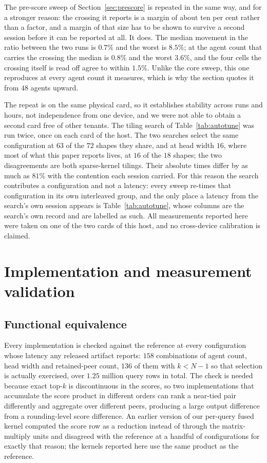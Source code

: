 The pre-score sweep of Section~\ref{sec:prescore} is repeated in the same way,
and for a stronger reason: the crossing it reports is a margin of about ten per
cent rather than a factor, and a margin of that size has to be shown to survive
a second session before it can be reported at all. It does. The median movement
in the ratio between the two runs is $0.7\%$ and the worst is $8.5\%$; at the
agent count that carries the crossing the median is $0.8\%$ and the worst
$3.6\%$, and the four cells the crossing itself is read off agree to within
$1.5\%$. Unlike the core sweep, this one reproduces at every agent count it
measures, which is why the section quotes it from $48$ agents upward.

The repeat is on the same physical card, so it establishes stability across
runs and hours, not independence from one device, and we were not able to
obtain a second card free of other tenants. The tiling search of
Table~\ref{tab:autotune} was run twice, once on each card of the host. The two
searches select the same configuration at $63$ of the $72$ shapes they share,
and at head width $16$, where most of what this paper reports lives, at $16$ of
the $18$ shapes; the two disagreements are both sparse-kernel tilings. Their
absolute times differ by as much as $81\%$ with the contention each session
carried. For this reason the search contributes a configuration and not a latency: every
sweep re-times that configuration in its own interleaved group, and the only
place a latency from the search's own session appears is
Table~\ref{tab:autotune}, whose columns are the search's own record and are
labelled as such. All measurements reported here
were taken on one of the two cards of this host, and no cross-device calibration
is claimed.

\section{Implementation and measurement validation}
\label{app:verification}

\subsection{Functional equivalence}

Every implementation is checked against the reference at every configuration
whose latency any released artifact reports: $158$ combinations of agent count,
head width and retained-peer count, $136$ of them with $k < N-1$ so that
selection is actually exercised, over $1.25$ million query rows in total. The check is needed because exact top-$k$ is discontinuous in the scores,
so two implementations that accumulate the score product in different orders can
rank a near-tied pair differently and aggregate over different peers, producing
a large output difference from a rounding-level score difference. An earlier
version of our per-query fused kernel computed the score row as a reduction
instead of through the matrix-multiply units and disagreed with the reference at
a handful of configurations for exactly that reason; the kernels reported here
use the same product as the reference.

